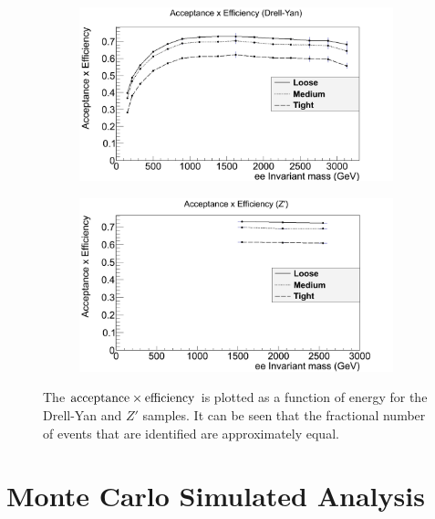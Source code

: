 \documentclass{article}
\begin{document}
\begin{figure}[htb]
	\centering
    \begin{subfigure}{.49\textwidth}
    	\raggedleft
        \includegraphics[width=1.13\textwidth]{images/acceptanceDY.png}
        \caption{}
        \label{fig:acceptanceDY}
    \end{subfigure}
    \begin{subfigure}{.49\textwidth}
    	\raggedright
        \includegraphics[width=1.13\textwidth]{images/acceptanceZ.png}
        \caption{}
        \label{fig:acceptanceZ}
    \end{subfigure}    	
    \caption{ The $\rm{acceptance}\times\rm{efficiency}$ is plotted as a function of energy for the Drell-Yan and $Z'$ samples. It can be seen that the fractional number of events that are identified are approximately equal. \label{fig:acceptance}}
\end{figure}



\section{Monte Carlo Simulated Analysis}
\label{sec:MonteCarloSimulatedAnalysis}
\end{document}
